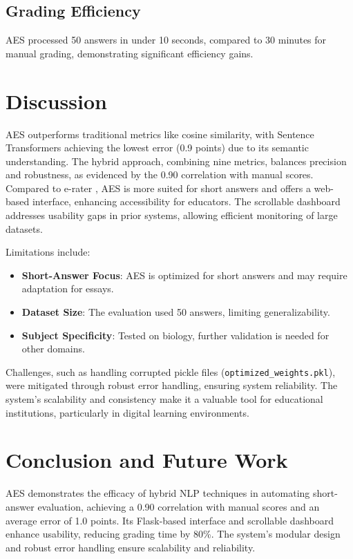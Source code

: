 \documentclass[conference]{IEEEtran}
\begin{document}
\subsection{Grading Efficiency}
AES processed 50 answers in under 10 seconds, compared to 30 minutes for manual grading, demonstrating significant efficiency gains.

\section{Discussion}
AES outperforms traditional metrics like cosine similarity, with Sentence Transformers achieving the lowest error (0.9 points) due to its semantic understanding. The hybrid approach, combining nine metrics, balances precision and robustness, as evidenced by the 0.90 correlation with manual scores. Compared to e-rater \cite{attali2006}, AES is more suited for short answers and offers a web-based interface, enhancing accessibility for educators. The scrollable dashboard addresses usability gaps in prior systems, allowing efficient monitoring of large datasets.

Limitations include:
\begin{itemize}
    \item \textbf{Short-Answer Focus}: AES is optimized for short answers and may require adaptation for essays.
    \item \textbf{Dataset Size}: The evaluation used 50 answers, limiting generalizability.
    \item \textbf{Subject Specificity}: Tested on biology, further validation is needed for other domains.
\end{itemize}

Challenges, such as handling corrupted pickle files (\texttt{optimized\_weights.pkl}), were mitigated through robust error handling, ensuring system reliability. The system’s scalability and consistency make it a valuable tool for educational institutions, particularly in digital learning environments.

\section{Conclusion and Future Work}
AES demonstrates the efficacy of hybrid NLP techniques in automating short-answer evaluation, achieving a 0.90 correlation with manual scores and an average error of 1.0 points. Its Flask-based interface and scrollable dashboard enhance usability, reducing grading time by 80\%. The system’s modular design and robust error handling ensure scalability and reliability.
\end{document}
